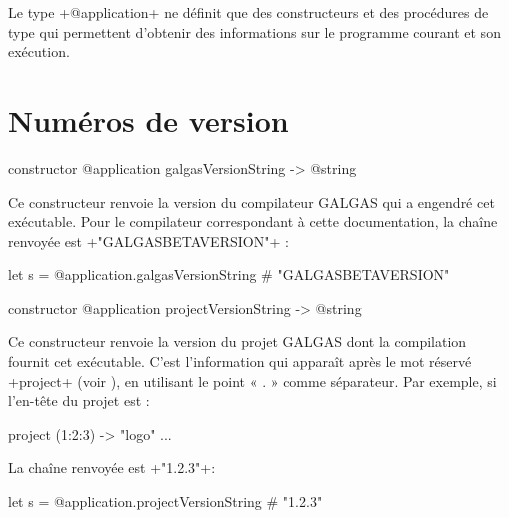 



Le type \ggsq+@application+ ne définit que des constructeurs et des procédures de type qui permettent d'obtenir des informations sur le programme courant et son exécution.


\section{Numéros de version}


\begin{galgas4box}
constructor @application galgasVersionString -> @string
\end{galgas4box}

Ce constructeur renvoie la version du compilateur GALGAS qui a engendré cet exécutable. Pour le compilateur correspondant à cette documentation, la chaîne renvoyée est \ggsq+"GALGASBETAVERSION"+ :

\begin{galgas4}
let s = @application.galgasVersionString # "GALGASBETAVERSION"
\end{galgas4}









\begin{galgas4box}
constructor @application projectVersionString -> @string
\end{galgas4box}

Ce constructeur renvoie la version du projet GALGAS dont la compilation fournit cet exécutable. C'est l'information qui apparaît après le mot réservé \ggsq+project+ (voir ), en utilisant le point « . » comme séparateur. Par exemple, si l'en-tête du projet est :

\begin{galgas4}
project (1:2:3) -> "logo" {
  ...
}
\end{galgas4}

La chaîne renvoyée est \ggsq+"1.2.3"+:
\begin{galgas4}
let s = @application.projectVersionString # "1.2.3"
\end{galgas4}










